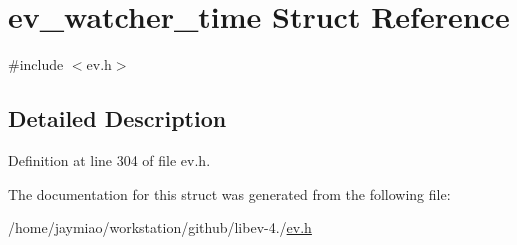 \hypertarget{structev__watcher__time}{\section{ev\-\_\-watcher\-\_\-time \-Struct \-Reference}
\label{structev__watcher__time}
}


{\ttfamily \#include $<$ev.\-h$>$}



\subsection{\-Detailed \-Description}


\-Definition at line 304 of file ev.\-h.



\-The documentation for this struct was generated from the following file\-:\begin{DoxyCompactItemize}
\item 
/home/jaymiao/workstation/github/libev-\/4./\hyperlink{ev_8h}{ev.\-h}\end{DoxyCompactItemize}
